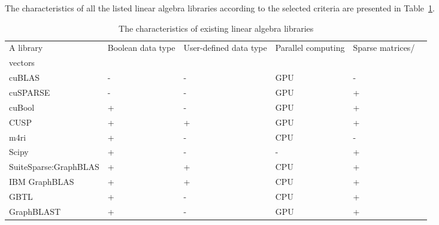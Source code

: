 The characteristics of all the listed linear algebra libraries according to the selected criteria are presented in Table~\ref{tab:LAlibraries}.

\begin{table} [htbp]
    \centering
    \begin{threeparttable}%
        \caption{The characteristics of existing linear algebra libraries}\label{tab:LAlibraries}%
        \begin{tabular}{| p{5.1cm} || p{2.2cm} | p{3cm} | p{2.2cm} | p{2.2cm}l |}
            \hline
            \hline
            A library   & \centering Boolean data type & \centering User-defined data type & \centering  Parallel computing & \centering  Sparse matrices/ \\ vectors &\\
            \hline
            cuBLAS & \centering	- & \centering -	 & \centering GPU	 & \centering -	 & \\
            cuSPARSE & \centering -	 & \centering -	 & \centering GPU	 & \centering +	 & \\
            cuBool & \centering	 + & \centering	- & \centering GPU	 & \centering +	 & \\
            CUSP & \centering	 + & \centering	+ & \centering GPU	 & \centering +	 & \\
            m4ri & \centering +	 & \centering -	 & \centering CPU	 & \centering -	 & \\
            Scipy & \centering +	& \centering -	 & \centering -	 & \centering +	 & \\
            SuiteSparse:GraphBLAS & \centering +& \centering +	 & \centering CPU	 & \centering	+ & \\
            IBM GraphBLAS & \centering +	 & \centering +	 & \centering CPU	 & \centering +	 & \\
            GBTL & \centering + & \centering -	 & \centering	CPU & \centering +	 & \\
            GraphBLAST & \centering +	 & \centering -	 & \centering GPU	 & \centering +	 & \\
            \hline
            \hline
        \end{tabular}
    \end{threeparttable}
\end{table}



